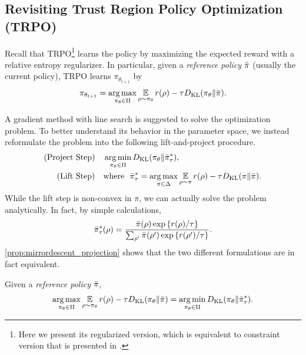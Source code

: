 \documentclass{article} %
\begin{document}
\subsection{Revisiting Trust Region Policy Optimization (TRPO)}
Recall that TRPO\footnote{Here we present its regularized version, which is equivalent to constraint version that is presented in \citet{schulman2015trust}. } learns the policy by maximizing the expected reward with a relative entropy regularizer.
In particular, given a \emph{reference policy} $\bar{\pi}$ (usually the current policy), 
TRPO learns $\pi_{\theta_{t+1}} $ by 
\begin{equation}
\label{eq:max_expected_reward_plus_relative_entropy}
\pi_{\theta_{t+1}} = \operatorname*{arg\,max}\limits_{\pi_\theta \in \Pi} { \operatorname*{\mathbb{E}}\limits_{\rho \sim \pi_\theta}{  r(\rho)  - \tau D_{\mathrm{KL}}(\pi_\theta \| \bar{\pi}) } }.
\end{equation}

A gradient method with line search is suggested to solve the optimization problem. 
To better understand its behavior in the parameter space, we instead reformulate the problem into the following lift-and-project procedure.
\begin{equation}
\label{eq:pmd}
\begin{split}
\text{(Project Step)} \quad &\operatorname*{arg\,min}\limits_{\pi_\theta \in \Pi}{D_{\mathrm{KL}}( \pi_\theta \| \bar{\pi}_{\tau}^* )}, \\
\text{(Lift Step)}  \quad & \text{where}\ \ \bar{\pi}_{\tau}^* =  \operatorname*{arg\,max}\limits_{\pi \in \Delta}{ \operatorname*{\mathbb{E}}\limits_{\rho \sim \pi}{  r(\rho)  - \tau D_{\mathrm{KL}}(\pi \| \bar{\pi}) } }. 
\end{split}
\end{equation}
While the lift step is non-convex in $\pi$, we can actually solve the problem analytically. In fact, by simple calculations,
\begin{equation}
\label{eq:pitaustar}
\bar{\pi}_\tau^*(\rho) =  \frac{\bar{\pi}(\rho) \exp\left\{ r(\rho) / \tau \right\}}{ \sum_{\rho^{\prime}}{\bar{\pi}(\rho^{\prime}) \exp\left\{ r(\rho^{\prime}) / \tau \right\} } }.
\end{equation}
\cref{prop:mirrordescent_projection} shows that the two different formulations are in fact equivalent.
\begin{prop}
\label{prop:mirrordescent_projection}
Given a \emph{reference policy} $\bar{\pi}$,
\[
 \operatorname*{arg\,max}\limits_{\pi_\theta \in \Pi} { \operatorname*{\mathbb{E}}\limits_{\rho \sim \pi_\theta}{  r(\rho)  - \tau D_{\mathrm{KL}}(\pi_\theta \| \bar{\pi}) } } 
 = \operatorname*{arg\,min}\limits_{\pi_\theta \in \Pi}{ D_{\mathrm{KL}}(\pi_\theta \| \bar{\pi}_\tau^*) }.
\]
\end{prop}
\end{document}
